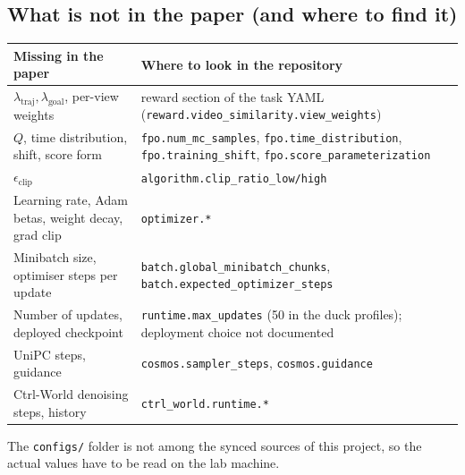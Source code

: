 \subsection{What is not in the paper (and where to find it)}
\begin{center}
\small
\begin{tabularx}{\linewidth}{@{}l Y@{}}
\toprule
Missing in the paper & Where to look in the repository\\
\midrule
$\lambda_{\mathrm{traj}},\lambda_{\mathrm{goal}}$, per-view weights & reward section of the task YAML (\texttt{reward.video\_similarity.view\_weights})\\
$Q$, time distribution, shift, score form & \texttt{fpo.num\_mc\_samples}, \texttt{fpo.time\_distribution}, \texttt{fpo.training\_shift}, \texttt{fpo.score\_parameterization}\\
$\epsilon_{\mathrm{clip}}$ & \texttt{algorithm.clip\_ratio\_low/high}\\
Learning rate, Adam betas, weight decay, grad clip & \texttt{optimizer.*}\\
Minibatch size, optimiser steps per update & \texttt{batch.global\_minibatch\_chunks}, \texttt{batch.expected\_optimizer\_steps}\\
Number of updates, deployed checkpoint & \texttt{runtime.max\_updates} (50 in the duck profiles); deployment choice not documented\\
UniPC steps, guidance & \texttt{cosmos.sampler\_steps}, \texttt{cosmos.guidance}\\
Ctrl-World denoising steps, history & \texttt{ctrl\_world.runtime.*}\\
\bottomrule
\end{tabularx}
\end{center}
The \texttt{configs/} folder is not among the synced sources of this project, so the actual values have to be read on the lab machine.

